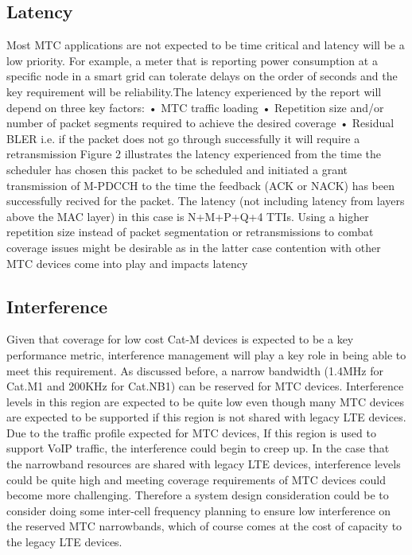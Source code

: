 \documentclass[conference,compsoc]{IEEEtran}
\begin{document}
\subsection{Latency}
Most MTC applications are not expected to be time critical and latency will be a low priority. For example, a meter that is reporting power consumption at a specific node in a smart grid can tolerate delays on the order of seconds and the key requirement will be reliability.The latency experienced by the report will depend on three key factors:
•	MTC traffic loading
•	Repetition size and/or number of packet segments required to achieve the desired coverage
•	Residual BLER i.e. if the packet does not go through successfully it will require a retransmission
Figure 2 illustrates the latency experienced from the time the scheduler has chosen this packet to be scheduled and initiated a grant transmission of M-PDCCH to the time the feedback (ACK or NACK) has been successfully recived for the packet. The latency (not including latency from layers above the MAC layer) in this case is N+M+P+Q+4 TTIs.  Using a higher repetition size instead of packet segmentation or retransmissions to combat coverage issues might be desirable as in the latter case contention with other MTC devices come into play and impacts latency

\subsection{Interference}
Given that coverage for low cost Cat-M devices is expected to be a key performance metric, interference management will play a key role in being able to meet this requirement. As discussed before, a narrow bandwidth (1.4MHz for Cat.M1 and 200KHz for Cat.NB1) can be reserved for MTC devices. Interference levels in this region are expected to be quite low even though many MTC devices are expected to be supported if this region is not shared with legacy LTE devices. Due to the traffic profile expected for MTC devices, If this region is used to support VoIP traffic, the interference could begin to creep up. In the case that the narrowband resources are shared with legacy LTE devices, interference levels could be quite high and meeting coverage requirements of MTC devices could become more challenging. Therefore a system design consideration could be to consider doing some inter-cell frequency planning to ensure low interference on the reserved MTC narrowbands, which of course comes at the cost of capacity to the legacy LTE devices.
\end{document}
